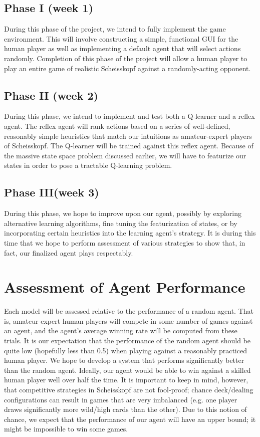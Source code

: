 \documentclass[paper=a4, fontsize=11pt]{scrartcl}
\numberwithin{equation}{section}		%
\numberwithin{figure}{section}			%
\numberwithin{table}{section}				%
\begin{document}
\subsection{Phase I (week 1)}
During this phase of the project, we intend to fully implement the game environment. This will involve constructing a simple, functional GUI for the human player as well as implementing a default agent that will select actions randomly. Completion of this phase of the project will allow a human player to play an entire game of realistic Scheisskopf against a randomly-acting opponent.

\subsection{Phase II (week 2)}
During this phase, we intend to implement and test both a Q-learner and a reflex agent. The reflex agent will rank actions based on a series of well-defined, reasonably simple heuristics that match our intuitions as amateur-expert players of Scheisskopf. The Q-learner will be trained against this reflex agent. Because of the massive state space problem discussed earlier, we will have to featurize our states in order to pose a tractable Q-learning problem. 

\subsection{Phase III(week 3)}
During this phase, we hope to improve upon our agent, possibly by exploring alternative learning algorithms, fine tuning the featurization of states, or by incorporating certain heuristics into the learning agent's strategy. It is during this time that we hope to perform assessment of various strategies to show that, in fact, our finalized agent plays respectably.

\section{Assessment of Agent Performance}
Each model will be assessed relative to the performance of a random agent. That is, amateur-expert human players will compete in some number of games against an agent, and the agent's average winning rate will be computed from these trials. It is our expectation that the performance of the random agent should be quite low (hopefully less than 0.5) when playing against a reasonably practiced human player. We hope to develop a system that performs significantly better than the random agent. Ideally, our agent would be able to win against a skilled human player well over half the time. It is important to keep in mind, however, that competitive strategies in Scheisskopf are not fool-proof; chance deck/dealing configurations can result in games that are very imbalanced (e.g. one player draws significantly more wild/high cards than the other). Due to this notion of chance, we expect that the performance of our agent will have an upper bound; it might be impossible to win some games.
\end{document}
